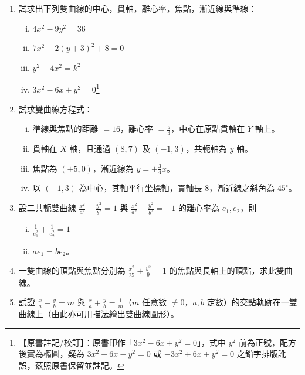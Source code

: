 \begin{enumerate}
  \item 試求出下列雙曲線的中心，貫軸，離心率，焦點，漸近線與準線：
  \begin{enumerate}[(i)]
    \item $4x^2 - 9y^2 = 36$
    \item $7x^2 - 2(y+3)^2 + 8 = 0$
    \item $y^2 - 4x^2 = k^2$
    \item $3x^2 - 6x + y^2 = 0$\label{note:b4s-ch3-ex2-1-4}\footnote{【原書註記/校訂】：原書印作「$3x^2 - 6x + y^2 = 0$」，式中 $y^2$ 前為正號，配方後實為橢圓，疑為 $3x^2 - 6x - y^2 = 0$ 或 $-3x^2 + 6x + y^2 = 0$ 之鉛字排版訛誤，茲照原書保留並註記。}
  \end{enumerate}

  \item 試求雙曲線方程式：
  \begin{enumerate}[(i)]
    \item 準線與焦點的距離 $= 16$，離心率 $= \frac{5}{3}$，中心在原點貫軸在 $Y$ 軸上。
    \item[*(\roman{enumii})] 貫軸在 $X$ 軸，且通過 $(8,7)$ 及 $(-1,3)$，共軛軸為 $y$ 軸。
    \item 焦點為 $(\pm 5, 0)$，漸近線為 $y = \pm \frac{3}{4}x$。
    \item[*(\roman{enumii})] 以 $(-1,3)$ 為中心，其軸平行坐標軸，貫軸長 8，漸近線之斜角為 $45^\circ$。
  \end{enumerate}

  \item 設二共軛雙曲線 $\frac{x^2}{a^2} - \frac{y^2}{b^2} = 1$ 與 $\frac{x^2}{a^2} - \frac{y^2}{b^2} = -1$ 的離心率為 $e_1, e_2$，則
  \begin{enumerate}[(i)]
    \item $\frac{1}{e_1^2} + \frac{1}{e_2^2} = 1$
    \item $a e_1 = b e_2$。
  \end{enumerate}

  \item 一雙曲線的頂點與焦點分別為 $\frac{x^2}{25} + \frac{y^2}{9} = 1$ 的焦點與長軸上的頂點，求此雙曲線。

  \item[*\theenumi.] 試證 $\frac{x}{a} - \frac{y}{b} = m$ 與 $\frac{x}{a} + \frac{y}{b} = \frac{1}{m}$（$m$ 任意數 $\neq 0$，$a, b$ 定數）的交點軌跡在一雙曲線上（由此亦可用描法繪出雙曲線圖形）。
\end{enumerate}

